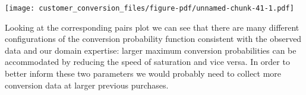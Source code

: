 \documentclass[
  letterpaper,
  DIV=11,
  numbers=noendperiod]{scrartcl}
\newenvironment{Shaded}{\begin{snugshade}}{\end{snugshade}}
\newcommand{\AttributeTok}[1]{\textcolor[rgb]{0.40,0.45,0.13}{#1}}
\newcommand{\DecValTok}[1]{\textcolor[rgb]{0.68,0.00,0.00}{#1}}
\newcommand{\FloatTok}[1]{\textcolor[rgb]{0.68,0.00,0.00}{#1}}
\newcommand{\FunctionTok}[1]{\textcolor[rgb]{0.28,0.35,0.67}{#1}}
\newcommand{\NormalTok}[1]{\textcolor[rgb]{0.00,0.23,0.31}{#1}}
\newcommand{\OtherTok}[1]{\textcolor[rgb]{0.00,0.23,0.31}{#1}}
\newcommand{\SpecialCharTok}[1]{\textcolor[rgb]{0.37,0.37,0.37}{#1}}
\newcommand{\StringTok}[1]{\textcolor[rgb]{0.13,0.47,0.30}{#1}}
\begin{document}
\begin{Shaded}
\end{Shaded}

\texttt{[image: customer\_conversion\_files/figure-pdf/unnamed-chunk-41-1.pdf]}

Looking at the corresponding pairs plot we can see that there are many
different configurations of the conversion probability function
consistent with the observed data and our domain expertise: larger
maximum conversion probabilities can be accommodated by reducing the
speed of saturation and vice versa. In order to better inform these two
parameters we would probably need to collect more conversion data at
larger previous purchases.
\end{document}
